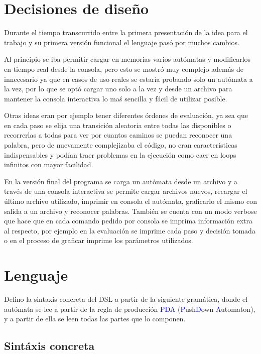 \documentclass[12pt,a4paper]{article}
\begin{document}
\section{Decisiones de diseño}
Durante el tiempo transcurrido entre la primera presentación de la idea para el
trabajo y su primera versión funcional el lenguaje pasó por muchos cambios.

Al principio se iba permitir cargar en memorias varios autómatas y modificarlos
en tiempo real desde la consola, pero esto se mostró muy complejo además de 
innecesario ya que en casos de uso reales se estaría probando solo un autómata
a la vez, por lo que se optó cargar uno solo a la vez y desde un archivo para
mantener la consola interactiva lo maś sencilla y fácil de utilizar posible.

Otras ideas eran por ejemplo tener diferentes órdenes de evaluación, ya sea
que en cada paso se elija una transición aleatoria entre todas las disponibles o
recorrerlas a todas para ver por cuantos caminos se puedan reconocer una palabra,
pero de nuevamente complejizaba el código, no eran características indispensables
y podían traer problemas en la ejecución como caer en loops infinitos con 
mayor facilidad.

En la versión final del programa se carga un autómata desde un archivo y a
través de una consola interactiva se permite cargar archivos nuevos, recargar
el último archivo utilizado, imprimir en consola el autómata, graficarlo el mismo
con salida a un archivo y reconocer palabras. También se cuenta con un modo verbose
que hace que en cada comando pedido por consola se imprima información extra
al respecto, por ejemplo en la evaluación se imprime cada paso y decisión tomada
o en el proceso de graficar imprime los parámetros utilizados.

\newpage

\section{Lenguaje}

Defino la sintaxis concreta del DSL a partir de la siguiente gramática, donde
el autómata se lee a partir de la regla de producción \textcolor{blue}{PDA} 
(\textcolor{blue}{P}ush\textcolor{blue}{D}own \textcolor{blue}{A}utomaton),
y a partir de ella se leen todas las partes que lo componen.

\subsection{Sintáxis concreta}
\end{document}
